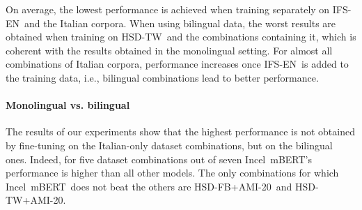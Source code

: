 \documentclass[11pt]{article}
\newcommand{\dsENclassification}{IFS-EN}
\newcommand{\dsITclassification}{IFS-IT}
\newcommand{\mbert}{\mbox{mBERT$_{base}$}}
\newcommand{\imbert}{\mbox{Incel mBERT}}
\newcommand{\hsdfb}{\mbox{HSD-FB}}
\newcommand{\hsdtw}{\mbox{HSD-TW}}
\newcommand{\ami}{\mbox{AMI-20}}
\begin{document}
On average, the lowest performance is achieved when training separately on \dsENclassification\, and the Italian corpora. When using bilingual data, the worst results are obtained when training on \hsdtw\, and the combinations containing it, which is coherent with the results obtained in the monolingual setting. For almost all combinations of Italian corpora, performance increases once \dsENclassification\, is added to the training data, i.e., bilingual combinations lead to better performance.


\paragraph{Monolingual vs. bilingual}
The results of our experiments show that the highest performance is not obtained by fine-tuning on the Italian-only dataset combinations, but on the bilingual ones. Indeed, for five dataset combinations out of seven \imbert's performance is higher than all other models.
The only combinations for which \imbert\, does not beat the others are \hsdfb+\ami\, and \hsdtw+\ami.
\end{document}
